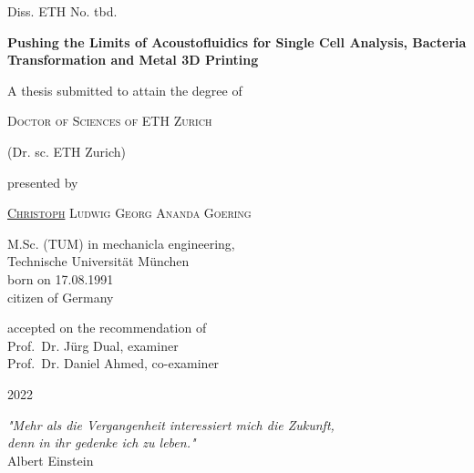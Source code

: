 \begin{titlepage}
{Diss. ETH No. tbd. \vspace{2.5cm}}
\begin{center}
\LARGE{\textbf{Pushing the Limits of Acoustofluidics for Single Cell Analysis, 
Bacteria Transformation and Metal 3D Printing}}
\end{center}
\vspace{2.0cm}
\begin{center}
{A thesis submitted to attain the degree of}
\end{center}
\begin{center}
{\textsc{Doctor of Sciences of ETH Zurich}}
\end{center}
\begin{center}
{(Dr. sc. ETH Zurich)} \end{center}
\vspace{2.0cm}
\begin{center}
{presented by}
\end{center}
\begin{center}
  {\textsc{\underline{Christoph} Ludwig Georg Ananda Goering}}
\end{center}
\begin{center}
{M.Sc. (TUM) in mechanicla engineering,\\
Technische Universit\"at M\"unchen\\
born on 17.08.1991 \\
citizen of Germany}
\end{center}
\vspace{1cm}
\begin{center}
{accepted on the recommendation of \\ \vspace{0.3cm}
Prof.\ Dr. J\"urg Dual, examiner \\
Prof.\ Dr. Daniel Ahmed, co-examiner}
\end{center}
\vspace{1cm}
\begin{center}
2022
\end{center}

\cleardoublepage
\thispagestyle{empty}
\vspace*{5.0cm}

\begin{center}
\vspace*{0.5cm}
\textit{"Mehr als die Vergangenheit interessiert mich die Zukunft,\\ denn in 
ihr gedenke ich zu leben." \\}
\vspace*{0.5cm}
Albert Einstein\\
\vspace*{2cm}


\end{center}
\end{titlepage}
